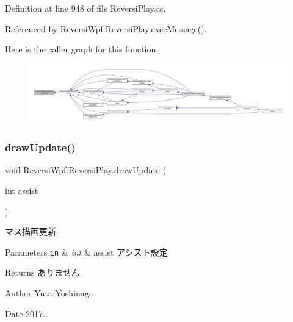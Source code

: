 Definition at line 948 of file Reversi\+Play.\+cs.



Referenced by Reversi\+Wpf.\+Reversi\+Play.\+exec\+Message().

Here is the caller graph for this function\+:
\nopagebreak
\begin{figure}[H]
\begin{center}
\leavevmode
\includegraphics[width=350pt]{class_reversi_wpf_1_1_reversi_play_adf9df9b9ae755f35bdc7d998cb1c43c4_icgraph}
\end{center}
\end{figure}
\mbox{\label{class_reversi_wpf_1_1_reversi_play_ae64bc4578a896ccd8fcff7b35763cf2e}} 
\subsubsection{\texorpdfstring{draw\+Update()}{drawUpdate()}}
{\footnotesize\ttfamily void Reversi\+Wpf.\+Reversi\+Play.\+draw\+Update (\begin{DoxyParamCaption}\item[{int}]{assist }\end{DoxyParamCaption})}



マス描画更新 


\begin{DoxyParams}[1]{Parameters}
\mbox{\tt in}  & {\em int} & assist アシスト設定 \\
\hline
\end{DoxyParams}
\begin{DoxyReturn}{Returns}
ありません 
\end{DoxyReturn}
\begin{DoxyAuthor}{Author}
Yuta Yoshinaga 
\end{DoxyAuthor}
\begin{DoxyDate}{Date}
2017.. 
\end{DoxyDate}


